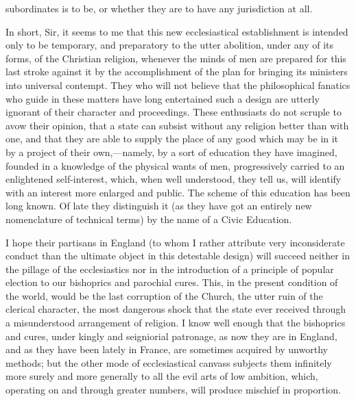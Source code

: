 subordinates is to be, or whether they are to have any jurisdiction at all.

In short, Sir, it seems to me that this new ecclesiastical establishment is intended only to be temporary, and preparatory to the utter abolition, under any of its forms, of the Christian religion, whenever the minds of men are prepared for this last stroke against it by the accomplishment of the plan for bringing its ministers into universal contempt. They who will not believe that the philosophical fanatics who guide in these matters have long entertained such a design are utterly ignorant of their character and proceedings. These enthusiasts do not scruple to avow their opinion, that a state can subsist without any religion better than with one, and that they are able to supply the place of any good which may be in it by a project of their own,—namely, by a sort of education they have imagined, founded in a knowledge of the physical wants of men, progressively carried to an enlightened self-interest, which, when well understood, they tell us, will identify with an interest more enlarged and public. The scheme of this education has been long known. Of late they distinguish it (as they have got an entirely new nomenclature of technical terms) by the name of a Civic Education.

I hope their partisans in England (to whom I rather attribute very inconsiderate conduct than the ultimate object in this detestable design) will succeed neither in the pillage of the ecclesiastics nor in the introduction of a principle of popular election to our bishoprics and parochial cures. This, in the present condition of the world, would be the last corruption of the Church, the utter ruin of the clerical character, the most dangerous shock that the state ever received through a misunderstood arrangement of religion. I know well enough that the bishoprics and cures, under kingly and seigniorial patronage, as now they are in England, and as they have been lately in France, are sometimes acquired by unworthy methods; but the other mode of ecclesiastical canvass subjects them infinitely more surely and more generally to all the evil arts of low ambition, which, operating on and through greater numbers, will produce mischief in proportion.

